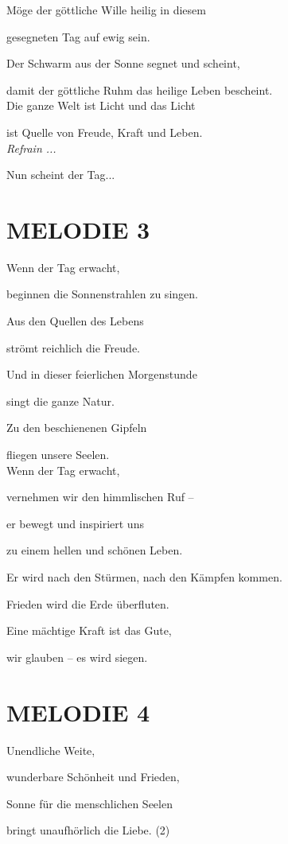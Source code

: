 \documentclass[11pt,a5paper,twoside]{article}
\begin{document}
Möge der göttliche Wille heilig in diesem  

gesegneten Tag auf ewig sein.

Der Schwarm aus der Sonne segnet und scheint,

damit der göttliche Ruhm das heilige Leben bescheint. \\

Die ganze Welt ist Licht und das Licht

ist Quelle von Freude, Kraft und Leben.\\


\textit{Refrain ...}

Nun scheint der Tag...

\section[Melodie 3]{MELODIE 3}

Wenn der Tag erwacht, 

beginnen die Sonnenstrahlen zu singen.

Aus den Quellen des Lebens

strömt reichlich die Freude. 

Und in dieser feierlichen Morgenstunde

singt die ganze Natur.

Zu den beschienenen Gipfeln

fliegen unsere Seelen.\\

Wenn der Tag erwacht,

vernehmen wir den himmlischen Ruf --

er bewegt und inspiriert uns

zu einem hellen und schönen Leben.

Er wird nach den Stürmen, nach den Kämpfen kommen.

Frieden wird die Erde überfluten.

Eine mächtige Kraft ist das Gute,

wir glauben -- es wird siegen. 

\section[Melodie 4]{MELODIE 4}

Unendliche Weite,

wunderbare Schönheit und Frieden,

Sonne für die menschlichen Seelen

bringt unaufhörlich die Liebe. (2) \\
\end{document}
